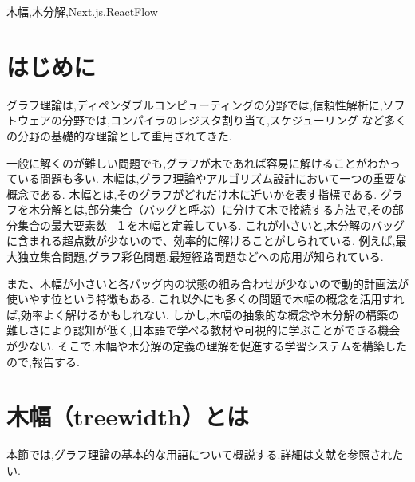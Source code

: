\documentclass[paper]{ieicej}
\begin{document}
\begin{abstract}
木幅は,グラフ理論やアルゴリズム設計において重要な概念である.
しかし,木幅の抽象的な概念や日本語で学べる教材が少ないなどという問題がある.
したがって,今回は木幅や木分解の定義理解を促進するWebアプリケーションによる学習システムを構築した.
\end{abstract}
\begin{keyword}
木幅,木分解,Next.js,ReactFlow
\end{keyword}
\begin{eabstract}
\end{eabstract}
\begin{ekeyword}
\end{ekeyword}
\maketitle

\section{はじめに}
グラフ理論\cite{wilson1979introduction}は,ディペンダブルコンピューティングの分野では,信頼性解析に,ソフトウェアの分野では,コンパイラのレジスタ割り当て,スケジューリング
など多くの分野の基礎的な理論として重用されてきた.

一般に解くのが難しい問題でも,グラフが木であれば容易に解けることがわかっている問題も多い.
木幅は,グラフ理論やアルゴリズム設計において一つの重要な概念である.
木幅とは,そのグラフがどれだけ木に近いかを表す指標である.
グラフを木分解とは,部分集合（バッグと呼ぶ）に分けて木で接続する方法で,その部分集合の最大要素数−１を木幅と定義している\cite{}. 
これが小さいと,木分解のバッグに含まれる超点数が少ないので、効率的に解けることがしられている\cite{robertson1986graph}.
例えば,最大独立集合問題,グラフ彩色問題,最短経路問題などへの応用が知られている.

また、木幅が小さいと各バッグ内の状態の組み合わせが少ないので動的計画法が使いやす位という特徴もある.
これ以外にも多くの問題で木幅の概念を活用すれば,効率よく解けるかもしれない.
しかし,木幅の抽象的な概念や木分解の構築の難しさにより認知が低く,日本語で学べる教材や可視的に学ぶことができる機会が少ない.
そこで,木幅や木分解の定義の理解を促進する学習システムを構築したので,報告する.

\section{木幅（treewidth）とは}
本節では,グラフ理論の基本的な用語について概説する.詳細は文献\cite{wilson1979introduction}を参照されたい. 
\end{document}
